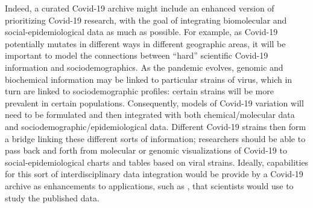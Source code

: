 \documentclass[11pt,letterpaper]{article}
\newcommand{\IQmol}{\resizebox{!}{7.5pt}{\AcronymText{IQmol}}}
\newcommand{\textscc}[1]{{\color{orr!35!black}{{%
						\fontfamily{Cabin-TLF}\fontseries{b}\selectfont{\textsc{\scriptsize{#1}}}}}}}
\newcommand{\AcronymText}[1]{{\textscc{#1}}}
\newcommand{\p}[1]{

\vspace{.85em}#1}
\newcommand{\q}[1]{{\fontfamily{qcr}\selectfont ``}#1{\fontfamily{qcr}\selectfont ''}}
\begin{document}
{\p{Indeed, a curated Covid-19 archive 
might include an enhanced version of \IQmol{} prioritizing 
Covid-19 research, with the goal of integrating biomolecular 
and social-epidemiological data as much as possible.  
For example, as Covid-19 potentially mutates in different 
ways in different geographic areas, it will be important 
to model the connections between \q{hard} scientific 
Covid-19 information and sociodemographics.  
As the pandemic evolves, genomic and biochemical information 
may be linked to particular strains of virus, which 
in turn are linked to sociodemographic profiles: certain 
strains will be more prevalent in certain populations.  
Consequently, models of Covid-19 variation will need to be 
formulated and then integrated with both chemical/molecular 
data and sociodemographic/epidemiological data.  Different 
Covid-19 strains then form a bridge linking these different 
sorts of information; researchers should be able to pass 
back and forth from molecular or genomic visualizations of 
Covid-19 to social-epidemiological charts and tables based 
on viral strains.  Ideally, capabilities for this 
sort of interdisciplinary data integration would be 
provide by a Covid-19 archive as enhancements to applications, 
such as \IQmol{}, that scientists would use to study the 
published data.}

}
\end{document}
